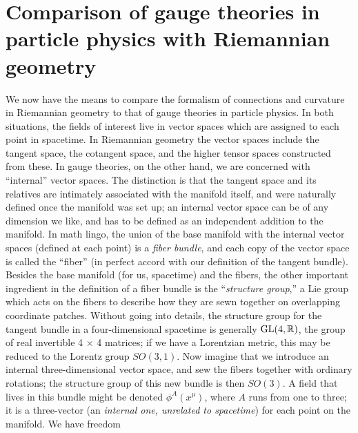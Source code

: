 \section{Comparison of gauge theories in particle physics with Riemannian geometry}
\label{subsec:GaugeTheoriesInterpretation}
We now have the means to compare the formalism of connections and curvature in Riemannian geometry to that of gauge theories in particle physics. In
both situations, the fields of interest live in vector spaces which are assigned to each point
in spacetime. In Riemannian geometry the vector spaces include the tangent space, the
cotangent space, and the higher tensor spaces constructed from these. In gauge theories,
on the other hand, we are concerned with “internal” vector spaces. The distinction is that
the tangent space and its relatives are intimately associated with the manifold itself, and
were naturally defined once the manifold was set up; an internal vector space can be of any
dimension we like, and has to be defined as an independent addition to the manifold. In
math lingo, the union of the base manifold with the internal vector spaces (defined at each
point) is a \emph{fiber bundle}, and each copy of the vector space is called the “fiber” (in perfect
accord with our definition of the tangent bundle).\\
Besides the base manifold (for us, spacetime) and the fibers, the other important ingredient in the definition of a fiber bundle is the “\emph{structure group},” a Lie group which acts
on the fibers to describe how they are sewn together on overlapping coordinate patches.
Without going into details, the structure group for the tangent bundle in a four-dimensional
spacetime is generally $\mathrm{GL}(4, \mathbb{R})$, the group of real invertible 4 × 4 matrices; if we have a
Lorentzian metric, this may be reduced to the Lorentz group $SO(3, 1)$. Now imagine that
we introduce an internal three-dimensional vector space, and sew the fibers together with
ordinary rotations; the structure group of this new bundle is then $SO(3)$. A field that lives
in this bundle might be denoted $\phi^A (x^μ )$, where $A$ runs from one to three; it is a three-vector
(an \emph{internal one, unrelated to spacetime}) for each point on the manifold. We have freedom

